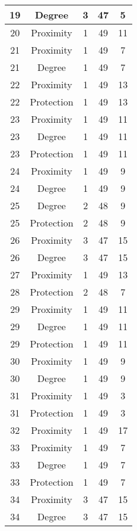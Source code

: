 \documentclass[results.tex]{subfiles}
\begin{document}
\begin{center}
\begin{tabular}{| c || c | c | c | c |}
    \hline
    19 & Degree & 3 & 47 & 5 \\ 
    \hline
    20 & Proximity & 1 & 49 & 11 \\ 
    \hline
    21 & Proximity & 1 & 49 & 7 \\ 
    \hline
    21 & Degree & 1 & 49 & 7 \\ 
    \hline
    22 & Proximity & 1 & 49 & 13 \\ 
    \hline
    22 & Protection & 1 & 49 & 13 \\ 
    \hline
    23 & Proximity & 1 & 49 & 11 \\ 
    \hline
    23 & Degree & 1 & 49 & 11 \\ 
    \hline
    23 & Protection & 1 & 49 & 11 \\ 
    \hline
    24 & Proximity & 1 & 49 & 9 \\ 
    \hline
    24 & Degree & 1 & 49 & 9 \\ 
    \hline
    25 & Degree & 2 & 48 & 9 \\ 
    \hline
    25 & Protection & 2 & 48 & 9 \\ 
    \hline
    26 & Proximity & 3 & 47 & 15 \\ 
    \hline
    26 & Degree & 3 & 47 & 15 \\ 
    \hline
    27 & Proximity & 1 & 49 & 13 \\ 
    \hline
    28 & Protection & 2 & 48 & 7 \\ 
    \hline
    29 & Proximity & 1 & 49 & 11 \\ 
    \hline
    29 & Degree & 1 & 49 & 11 \\ 
    \hline
    29 & Protection & 1 & 49 & 11 \\ 
    \hline
    30 & Proximity & 1 & 49 & 9 \\ 
    \hline
    30 & Degree & 1 & 49 & 9 \\ 
    \hline
    31 & Proximity & 1 & 49 & 3 \\ 
    \hline
    31 & Protection & 1 & 49 & 3 \\ 
    \hline
    32 & Proximity & 1 & 49 & 17 \\ 
    \hline
    33 & Proximity & 1 & 49 & 7 \\ 
    \hline
    33 & Degree & 1 & 49 & 7 \\ 
    \hline
    33 & Protection & 1 & 49 & 7 \\ 
    \hline
    34 & Proximity & 3 & 47 & 15 \\ 
    \hline
    34 & Degree & 3 & 47 & 15 \\ 

\end{tabular}
\end{center}
\end{document}

